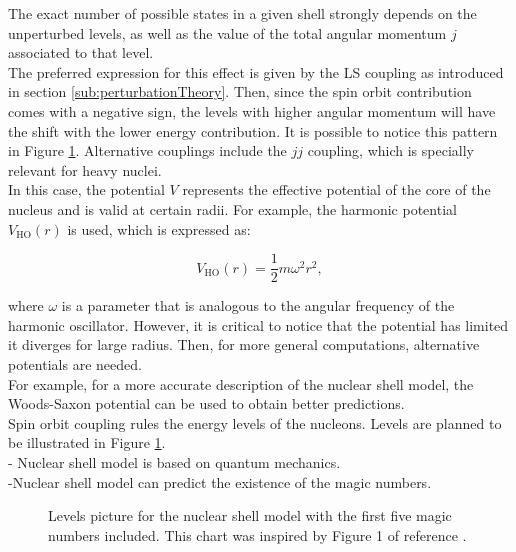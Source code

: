 \documentclass[openany]{book}
\begin{document}
The exact number of possible states in a given shell strongly depends on the unperturbed levels, as well as the value of the total angular momentum $j$ associated to that level.  \\

The preferred expression for this effect is given by the LS coupling as introduced in section \ref{sub:perturbationTheory}. Then, since the spin orbit contribution comes with a negative sign, the levels with higher angular momentum will have the shift with the lower energy contribution. It is possible to notice this pattern in Figure \ref{fig:nuclerShellModelLevels}. Alternative couplings include the $jj$ coupling, which is specially relevant for heavy nuclei. \\

In this case, the potential $V$ represents the effective potential of the core of the nucleus and is valid at certain radii. For example, the harmonic potential $V_{\mathrm{HO}}(r)$ is used, which is expressed as: 


\begin{equation} \label{eq:nuclearShell_harmonicOscillator}
	V_{\mathrm{HO}}(r) = \frac{1}{2}m\omega^2r^2,
\end{equation}

where $\omega$ is a parameter that is analogous to the angular frequency of the harmonic oscillator. However, it is critical to notice that the potential has limited it diverges for large radius. Then, for more general computations, alternative potentials are needed.  \\

For example, for a more accurate description of the nuclear shell model, the Woods-Saxon potential can be used to obtain better predictions. \\

Spin orbit coupling rules the energy levels of the nucleons. Levels are planned to be illustrated in Figure \ref{fig:nuclerShellModelLevels}.  \\

- Nuclear shell model is based on quantum mechanics. \\
-Nuclear shell model can predict the existence of the magic numbers.

\begin{figure}[H]
	
	\caption[Nuclear shell model levels picture]{Levels picture for the nuclear shell model with the first five magic numbers included. This chart was inspired by Figure 1 of reference \cite{tran_ong_hagen_morris_aoi_suzuki_kanada-enyo_geng_terashima_tanihata_2018}. }
	\label{fig:nuclerShellModelLevels}
\end{figure}
\end{document}
